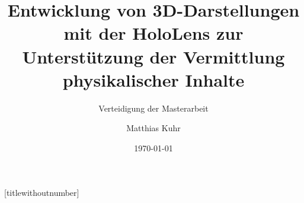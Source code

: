 \documentclass{beamer}
\title{Entwicklung von 3D-Darstellungen mit der HoloLens zur Unterstützung der Vermittlung physikalischer Inhalte}
\subtitle{Verteidigung der Masterarbeit}
\author{Matthias Kuhr}
\date{\today}
\begin{document}
{
	[titlewithoutnumber] %
	\maketitle
	
	\nocite{Zimmer17,Milgram94}
}


%




\end{document}
